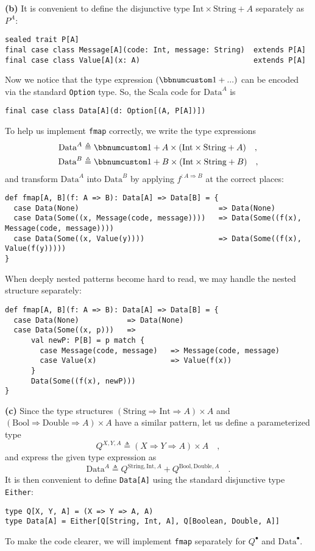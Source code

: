 \textbf{(b)} It is convenient to define the disjunctive type $\text{Int}\times\text{String}+A$
separately as $P^{A}$:
\begin{lstlisting}
sealed trait P[A]
final case class Message[A](code: Int, message: String)  extends P[A]
final case class Value[A](x: A)                          extends P[A]
\end{lstlisting}
Now we notice that the type expression $\left(\bbnum 1+...\right)$
can be encoded via the standard \lstinline!Option! type. So, the
Scala code for $\text{Data}^{A}$ is
\begin{lstlisting}
final case class Data[A](d: Option[(A, P[A])])
\end{lstlisting}
To help us implement \lstinline!fmap! correctly, we write the type
expressions 
\begin{align*}
\text{Data}^{A} & \triangleq\bbnum 1+A\times(\text{Int}\times\text{String}+A)\quad,\\
\text{Data}^{B} & \triangleq\bbnum 1+B\times(\text{Int}\times\text{String}+B)\quad,
\end{align*}
and transform $\text{Data}^{A}$ into $\text{Data}^{B}$ by applying
$f^{:A\Rightarrow B}$ at the correct places:
\begin{lstlisting}
def fmap[A, B](f: A => B): Data[A] => Data[B] = {
  case Data(None)                                => Data(None)
  case Data(Some((x, Message(code, message))))   => Data(Some((f(x), Message(code, message))))
  case Data(Some((x, Value(y))))                 => Data(Some((f(x), Value(f(y)))))
}
\end{lstlisting}
When deeply nested patterns become hard to read, we may handle the
nested structure separately:
\begin{lstlisting}
def fmap[A, B](f: A => B): Data[A] => Data[B] = {
  case Data(None)           => Data(None)
  case Data(Some((x, p)))   =>
      val newP: P[B] = p match {
        case Message(code, message)   => Message(code, message)
        case Value(x)                 => Value(f(x))
      }
      Data(Some((f(x), newP)))
}
\end{lstlisting}

\textbf{(c)} Since the type structures $(\text{String}\Rightarrow\text{Int}\Rightarrow A)\times A$
and $(\text{Bool}\Rightarrow\text{Double}\Rightarrow A)\times A$
have a similar pattern, let us define a parameterized type
\[
Q^{X,Y,A}\triangleq\left(X\Rightarrow Y\Rightarrow A\right)\times A\quad,
\]
and express the given type expression as 
\[
\text{Data}^{A}\triangleq Q^{\text{String},\text{Int},A}+Q^{\text{Bool},\text{Double},A}\quad.
\]
It is then convenient to define \lstinline!Data[A]! using the standard
disjunctive type \lstinline!Either!: 
\begin{lstlisting}
type Q[X, Y, A] = (X => Y => A, A)
type Data[A] = Either[Q[String, Int, A], Q[Boolean, Double, A]]
\end{lstlisting}
To make the code clearer, we will implement \lstinline!fmap! separately
for $Q^{\bullet}$ and $\text{Data}^{\bullet}$.


